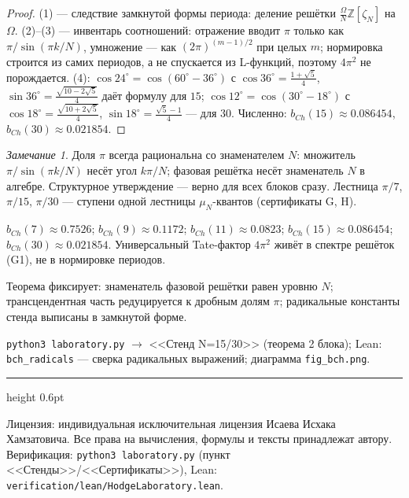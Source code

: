 \documentclass[11pt,a4paper]{article}
\theoremstyle{plain}
\theoremstyle{definition}
\theoremstyle{remark}
\newtheorem{remark}[theorem]{Замечание}
\newcommand{\ZZ}{\mathbb{Z}}
\begin{document}
\begin{proof}
(1) --- следствие замкнутой формы периода: деление решётки
$\frac{\Omega}N\ZZ[\zeta_N]$ на $\Omega$.
(2)--(3) --- инвентарь соотношений: отражение вводит $\pi$ только
как $\pi/\sin(\pi k/N)$, умножение --- как $(2\pi)^{(m-1)/2}$ при
целых $m$; нормировка строится из самих периодов, а не спускается
из L-функций, поэтому $4\pi^2$ не порождается. (4):
$\cos24^\circ=\cos(60^\circ-36^\circ)$ с
$\cos36^\circ=\frac{1+\sqrt5}4$,
$\sin36^\circ=\frac{\sqrt{10-2\sqrt5}}4$ даёт формулу для $15$;
$\cos12^\circ=\cos(30^\circ-18^\circ)$ с
$\cos18^\circ=\frac{\sqrt{10+2\sqrt5}}4$,
$\sin18^\circ=\frac{\sqrt5-1}4$ --- для $30$.
Численно: $b_{Ch}(15)\approx0.086454$, $b_{Ch}(30)\approx0.021854$.
\end{proof}

\begin{remark}
Доля $\pi$ всегда рациональна со знаменателем $N$: множитель
$\pi/\sin(\pi k/N)$ несёт угол $k\pi/N$; фазовая решётка несёт
знаменатель $N$ в алгебре. Структурное утверждение --- верно для
всех блоков сразу. Лестница $\pi/7$, $\pi/15$, $\pi/30$ --- ступени
одной лестницы $\mu_N$-квантов (сертификаты G, H).
\end{remark}

\begin{databox}[числа]
$b_{Ch}(7)\approx0.7526$; $b_{Ch}(9)\approx0.1172$;
$b_{Ch}(11)\approx0.0823$; $b_{Ch}(15)\approx0.086454$;
$b_{Ch}(30)\approx0.021854$. Универсальный Tate-фактор $4\pi^2$
живёт в спектре решёток (G1), не в нормировке периодов.
\end{databox}

\begin{statusbox}[итог]
Теорема фиксирует: знаменатель фазовой решётки равен уровню $N$;
трансцендентная часть редуцируется к дробным долям $\pi$;
радикальные константы стенда выписаны в замкнутой форме.
\end{statusbox}

\begin{verifybox}
\texttt{python3 laboratory.py} $\to$ <<Стенд N=15/30>> (теорема 2
блока); Lean: \texttt{bch\_radicals} --- сверка радикальных
выражений; диаграмма \texttt{fig\_bch.png}.
\end{verifybox}

\vfill
{\color{linkblue}\hrule height 0.6pt}
\vspace{0.5em}
{\small\color{gray}
Лицензия: индивидуальная исключительная лицензия Исаева Исхака Хамзатовича.
Все права на вычисления, формулы и тексты принадлежат автору.
Верификация: \texttt{python3 laboratory.py} (пункт <<Стенды>>/<<Сертификаты>>),
Lean: \texttt{verification/lean/HodgeLaboratory.lean}.
}
\end{document}
